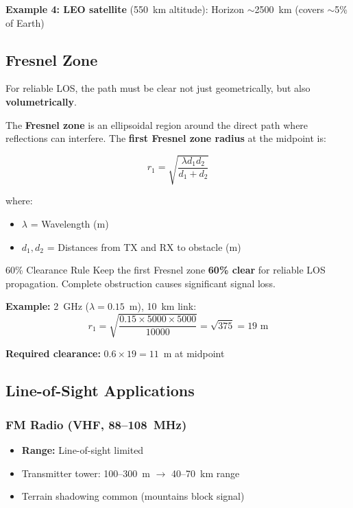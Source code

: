 \textbf{Example 4: LEO satellite} (550~km altitude): Horizon $\sim$2500~km (covers $\sim$5\% of Earth)

\subsection{Fresnel Zone}

For reliable LOS, the path must be clear not just geometrically, but also \textbf{volumetrically}.

The \textbf{Fresnel zone} is an ellipsoidal region around the direct path where reflections can interfere. The \textbf{first Fresnel zone radius} at the midpoint is:

\begin{equation}
\label{eq:fresnel-zone}
r_1 = \sqrt{\frac{\lambda d_1 d_2}{d_1 + d_2}}
\end{equation}

where:
\begin{itemize}
\item $\lambda$ = Wavelength (m)
\item $d_1, d_2$ = Distances from TX and RX to obstacle (m)
\end{itemize}

\begin{importantbox}{60\% Clearance Rule}
Keep the first Fresnel zone \textbf{60\% clear} for reliable LOS propagation. Complete obstruction causes significant signal loss.
\end{importantbox}

\textbf{Example:} 2~GHz ($\lambda = 0.15$~m), 10~km link:
\begin{equation}
r_1 = \sqrt{\frac{0.15 \times 5000 \times 5000}{10000}} = \sqrt{375} = 19\text{ m}
\end{equation}

\textbf{Required clearance:} $0.6 \times 19 = 11$~m at midpoint

\subsection{Line-of-Sight Applications}

\subsubsection{FM Radio (VHF, 88--108~MHz)}

\begin{itemize}
\item \textbf{Range:} Line-of-sight limited
\item Transmitter tower: 100--300~m $\rightarrow$ 40--70~km range
\item Terrain shadowing common (mountains block signal)
\end{itemize}

